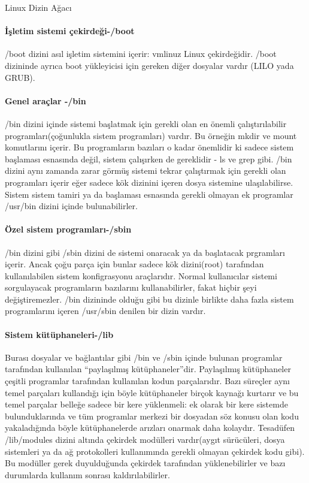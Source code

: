 \begin{section}{Linux Dizin Ağacı}
\paragraph{İşletim sistemi çekirdeği-/boot}{/boot dizini asıl işletim sistemini içerir: vmlinuz Linux çekirdeğidir. /boot dizininde ayrıca boot yükleyicisi için gereken diğer dosyalar vardır (LILO yada GRUB).}

\paragraph{Genel araçlar -/bin}{/bin dizini içinde sistemi başlatmak için gerekli olan en önemli çalıştırılabilir programları(çoğunlukla sistem programları) vardır. Bu örneğin mkdir ve mount komutlarını içerir. Bu programların bazıları o kadar önemlidir ki sadece sistem başlaması esnasında değil, sistem çalışırken de gereklidir - ls ve grep gibi. /bin dizini aynı zamanda zarar görmüş sistemi tekrar çalıştırmak için gerekli olan programları içerir eğer sadece kök dizinini içeren dosya sistemine ulaşılabilirse. Sistem sistem tamiri ya da başlaması esnasında gerekli olmayan ek programlar /usr/bin dizini içinde bulunabilirler.}

\paragraph{Özel sistem programları-/sbin}{ /bin dizini gibi /sbin dizini de sistemi onaracak ya da başlatacak prgramları içerir. Ancak çoğu parça için bunlar sadece kök dizini(root) tarafından kullanılabilen sistem konfigrasyonu araçlarıdır. Normal kullanıcılar sistemi sorgulayacak programların bazılarını kullanabilirler, fakat hiçbir şeyi değiştiremezler. /bin dizininde olduğu gibi bu dizinle birlikte daha fazla sistem programlarını içeren /usr/sbin denilen bir dizin vardır.}

\paragraph{Sistem kütüphaneleri-/lib}{Burası dosyalar ve bağlantılar gibi /bin ve /sbin içinde bulunan programlar tarafından kullanılan “paylaşılmış kütüphaneler”dir. Paylaşılmış kütüphaneler çeşitli programlar tarafından kullanılan kodun parçalarıdır. Bazı süreçler aynı temel parçaları kullandığı için böyle kütüphaneler birçok kaynağı kurtarır ve bu temel parçalar belleğe sadece bir kere yüklenmeli: ek olarak bir kere sistemde bulunduklarında ve tüm programlar merkezi bir dosyadan söz konusu olan kodu yakaladığında böyle kütüphanelerde arızları onarmak daha kolaydır. Tesadüfen /lib/modules dizini altında çekirdek modülleri vardır(aygıt sürücüleri, dosya sistemleri ya da ağ protokolleri kullanımında gerekli olmayan çekirdek kodu gibi). Bu modüller gerek duyulduğunda çekirdek tarafından yüklenebilirler ve bazı durumlarda kullanım sonrası kaldırılabilirler.}


\end{section}
